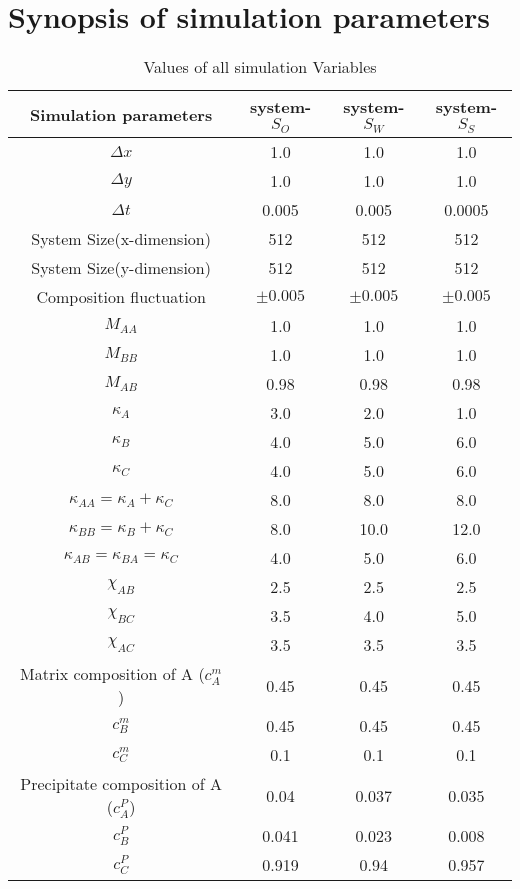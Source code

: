 \documentclass[12pt]{iiscthes}
\theoremstyle{definition}
\theoremstyle{definition}
\theoremstyle{remark}
\begin{document}
\section{Synopsis of simulation parameters}\label{sp}
\begin{table}[h]
\begin{center}
 \begin{tabular}{|c|c|c|c|}
 \hline
 \textbf{Simulation parameters} & \textbf{system-$S_O$} & \textbf{system-$S_W$} & \textbf{system-$S_S$}\\
 \hline
 $ \Delta x $ & 1.0 &1.0&1.0\\
 \hline
 $ \Delta y $ & 1.0 &1.0&1.0\\
 \hline
 $ \Delta t $ & 0.005 &0.005&0.0005\\
 \hline
 System Size(x-dimension)  & 512 &512&512\\
 \hline
  System Size(y-dimension)  &512 & 512 &512\\
  \hline
  Composition fluctuation & $ \pm 0.005 $ & $\pm 0.005$ & $\pm 0.005$\\
  \hline\hline
  $ M_{AA} $ &1.0 & 1.0&1.0\\
  \hline
  $ M_{BB} $& 1.0 & 1.0&1.0\\
  \hline
  $ M_{AB} $ &0.98 & 0.98 & 0.98\\
  \hline\hline
  $ \kappa_ A $ & 3.0 & 2.0&1.0\\
  \hline
   $ \kappa _B $ & 4.0 & 5.0&6.0\\
  \hline
   $ \kappa _C $ & 4.0 & 5.0 & 6.0\\
  \hline \hline
   $ \kappa _{AA}=\kappa_A+\kappa_C $ & 8.0 & 8.0 & 8.0\\
  \hline
   $ \kappa _{BB}=\kappa_B+\kappa_C $ & 8.0 & 10.0 & 12.0\\
  \hline
   $ \kappa_ {AB}=\kappa_{BA}=\kappa_C $ & 4.0 & 5.0 & 6.0\\
\hline\hline
   $ \chi_{AB}$ & 2.5 & 2.5 & 2.5 \\
  \hline
   $ \chi _{BC}$ & 3.5 & 4.0 & 5.0 \\
  \hline
   $ \chi_ {AC}$ & 3.5 & 3.5 & 3.5\\   
  \hline\hline
  Matrix composition of A ($c_A^m$ ) &  0.45 & 0.45 &0.45\\
  \hline
  $c_B^m$ & 0.45 & 0.45 &0.45 \\
  \hline
  $c_C^m$ &  0.1 & 0.1 & 0.1 \\
  \hline\hline
  Precipitate composition of A ($c_A^P$) &  0.04 & 0.037 &0.035 \\
  \hline
  $c_B^P$ &  0.041 & 0.023 & 0.008 \\
  \hline
  $c_C^P$ & 0.919 & 0.94 & 0.957 \\
  \hline\hline
 \end{tabular}\caption{Values of all simulation Variables}\label{sv}
 \end{center}
\end{table}
\end{document}
